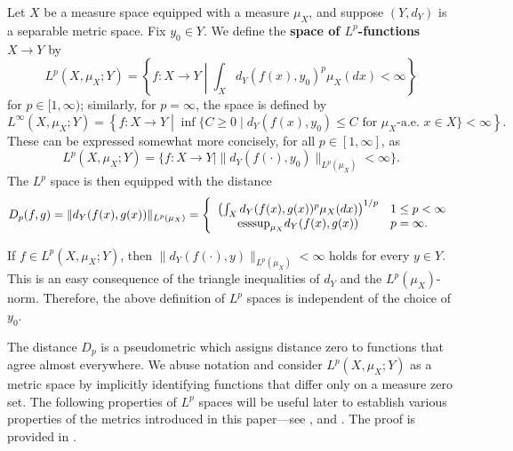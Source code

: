 \documentclass[twoside,11pt]{article}
\theoremstyle{definition}
\newcommand{\define}[1]{\textbf{#1}}
\begin{document}
\begin{definition}
\label{def:metric_lp_spaces}
Let $X$ be a measure space equipped with a measure $\mu_X$, and suppose $(Y,d_Y)$ is a separable metric space. Fix $y_0\in Y$. We define the \define{space of $L^p$-functions $X \to Y$} by
    \begin{equation} 
        L^p(X,\mu_X; Y) = \left\{f:X\to Y \middle| \int_{X}d_Y(f(x),y_0)^p\mu_X(dx)<\infty \right\}
    \end{equation}
for $p \in [1,\infty)$; similarly, for $p = \infty$, the space is defined by
\begin{equation} 
    L^\infty(X,\mu_X; Y) = \left\{f:X \to Y \middle| 
\inf \{C \geq 0 \mid d_Y(f(x),y_0) \leq C \mbox{ for $\mu_X$-a.e. $x \in X$} \} < \infty \right\}.
\end{equation}
These can be expressed somewhat more concisely, for all $p \in [1,\infty]$, as 
\[
L^p(X,\mu_X;Y) = \{f:X \to Y \mid \|d_Y(f(\cdot),y_0)\|_{L^p(\mu_X)} < \infty\}.
\]
The $L^p$ space is then equipped with the distance
    \[
        D_p(f,g)         = \|d_Y(f(x),g(x))\|_{L^p(\mu_X)} = \left\{\begin{array}{cl}
        \left(\int_{X}d_Y(f(x),g(x))^p\mu_X(dx)\right)^{1/p} & 1\leq p<\infty \\
     \textnormal{esssup}_{\mu_X}d_Y(f(x),g(x)) & p=\infty. \end{array}\right.
   \]
\end{definition}

\begin{remark}
    If $f \in L^p(X,\mu_X;Y)$, then $\|d_Y(f(\cdot),y)\|_{L^p(\mu_X)} < \infty$ holds for every $y \in Y$. This is an easy consequence of the triangle inequalities of $d_Y$ and the $L^p(\mu_X)$-norm. Therefore, the above definition of $L^p$ spaces is independent of the choice of $y_0$.
\end{remark}

The distance $D_p$ is a pseudometric which assigns distance zero to functions that agree almost everywhere. We abuse notation and consider $L^p(X,\mu_X; Y)$ as a metric space by implicitly identifying functions that differ only on a measure zero set. The following properties of $L^p$ spaces will be useful later to establish various properties of the metrics introduced in this paper---see ,  and . The proof is provided in . 
\end{document}
